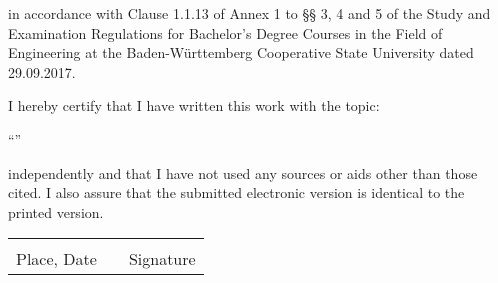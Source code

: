 
in accordance with Clause 1.1.13 of Annex 1 to §§ 3, 4 and 5 of the Study and Examination Regulations for Bachelor's Degree Courses in the Field of Engineering at the Baden-Württemberg Cooperative State University dated 29.09.2017.

I hereby certify that I have written this work with the topic:

\vspace*{3mm}
\begin{center}
{\large ``\myTitle''}
\end{center}
\vspace*{3mm}

independently and that I have not used any sources or aids other than those cited. I also assure that the submitted electronic version is identical to the printed version.

\vspace*{15mm}

\begin{tabular}{@{}p{6cm}p{.5cm}p{5cm}@{}}
\hrulefill & & \hrulefill \\
Place, Date & & Signature \\
\end{tabular}
